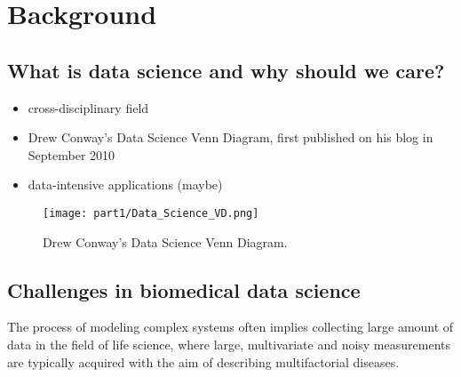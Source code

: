 
\chapter{Background} \label{chap:background}


\section{What is data science and why should we care?} \label{sec:data_science}





\begin{itemize}
  \item cross-disciplinary field
  \item Drew Conway's Data Science Venn Diagram, first published on his blog in September 2010
  \item data-intensive applications (maybe)

\end{itemize}

\begin{figure}
  \centering
    \texttt{[image: part1/Data\_Science\_VD.png]}
    \caption{Drew Conway's Data Science Venn Diagram\protect\footnotemark.} \label{fig:data_science_venn_diagram}
\end{figure}

\section{Challenges in biomedical data science} \label{sec:challenges_biomedical}
The process of modeling complex systems often implies collecting large amount of data in the field of life science, where large, multivariate and noisy measurements are typically acquired with the aim of describing multifactorial diseases.



